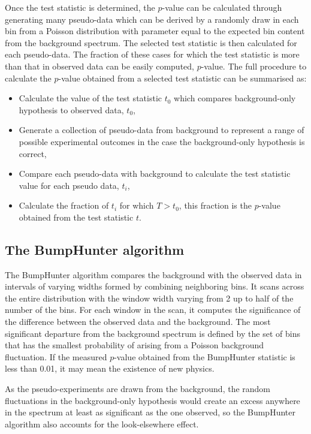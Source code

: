 Once the test statistic is determined, the $p$-value can be calculated through generating many pseudo-data which can be derived by a randomly draw in each bin from a Poisson distribution with parameter equal to the expected bin content from the background spectrum.
The selected test statistic is then calculated for each pseudo-data.
The fraction of these cases for which the test statistic is more than that in observed data can be easily computed, $p$-value.
The full procedure to calculate the $p$-value obtained from a selected test statistic can be summarised as:
\begin{itemize}
        \item Calculate the value of the test statistic $t_{0}$ which compares background-only hypothesis to observed data, $t_{0}$,
        \item Generate a collection of pseudo-data from background to represent a range of possible experimental outcomes in the case the background-only hypothesis is correct,
        \item Compare each pseudo-data with background to calculate the test statistic value for each pseudo data, $t_{i}$,
        \item Calculate the fraction of $t_{i}$ for which $T > t_{0}$, this fraction is the $p$-value obtained from the test statistic $t$.
\end{itemize}

\subsection{The BumpHunter algorithm}
The BumpHunter algorithm compares the background with the observed data in intervals of varying widths formed by combining neighboring bins. 
It scans across the entire distribution with the window width varying from 2 up to half of the number of the bins. 
For each window in the scan, it computes the significance of the difference between the observed data and the background. 
The most significant departure from the background spectrum is defined by the set of bins that has the smallest probability of arising from a Poisson background fluctuation. 
If the measured $p$-value obtained from the BumpHunter statistic is less than 0.01, it may mean the existence of new physics. 

As the pseudo-experiments are drawn from the background, the random fluctuations in the background-only hypothesis would create an excess anywhere in the spectrum at least as significant as the one observed, so the BumpHunter algorithm also accounts for the look-elsewhere effect.

